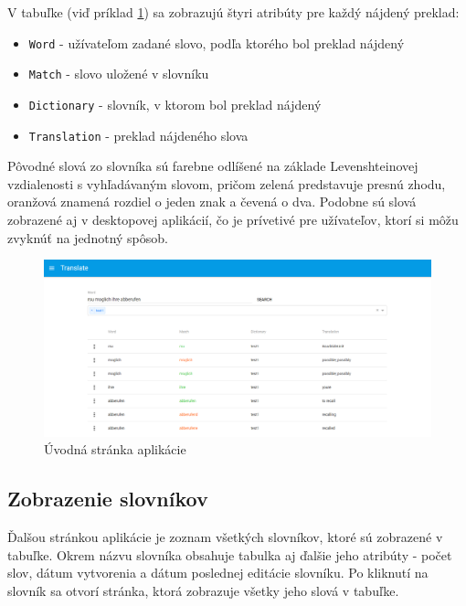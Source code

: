 \documentclass[
  digital, %
  table,   %
  lof,     %
  lot,     %
]{fithesis3}
\begin{document}
V tabuľke (viď príklad \ref{fig:translate-page}) sa zobrazujú štyri atribúty pre každý nájdený preklad:

\begin{itemize}
\item \texttt{Word} - užívateľom zadané slovo, podľa ktorého bol preklad nájdený
\item \texttt{Match} - slovo uložené v slovníku
\item \texttt{Dictionary} - slovník, v ktorom bol preklad nájdený
\item \texttt{Translation} - preklad nájdeného slova
\end{itemize}

Pôvodné slová zo slovníka sú farebne odlíšené na základe Levenshteinovej vzdialenosti s vyhľadávaným slovom, pričom zelená predstavuje presnú zhodu, oranžová znamená rozdiel o jeden znak a čevená o dva. Podobne sú slová zobrazené aj v desktopovej aplikácií, čo je prívetivé pre užívateľov, ktorí si môžu zvyknúť na jednotný spôsob.

\begin{figure}
	\begin{center}
	\includegraphics[width=1.0\textwidth]{img/translate-page.png}
	\end{center}
    \caption{Úvodná stránka aplikácie}
	\label{fig:translate-page}
\end{figure}

\subsection{Zobrazenie slovníkov}
Ďalšou stránkou aplikácie je zoznam všetkých slovníkov, ktoré sú zobrazené v tabuľke. Okrem názvu slovníka obsahuje tabulka aj ďalšie jeho atribúty - počet slov, dátum vytvorenia a dátum poslednej editácie slovníku. Po kliknutí na slovník sa otvorí stránka, ktorá zobrazuje všetky jeho slová v tabuľke.
\end{document}
